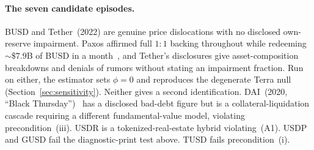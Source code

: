\paragraph{The seven candidate episodes.} BUSD and
Tether~(2022) are genuine price dislocations with no disclosed own-reserve
impairment. Paxos affirmed full $1{:}1$ backing throughout while redeeming ${\sim}\$7.9$B
of BUSD in a month~\cite{paxos2023busd}, and Tether's disclosures give asset-composition
breakdowns and denials of rumors without stating an impairment fraction. Run on either, the
estimator sets $\phi=0$ and reproduces the degenerate Terra null
(Section~\ref{sec:sensitivity}). Neither gives a second identification.
DAI~(2020, ``Black Thursday'')~\cite{Gudgeon_2020} has a disclosed bad-debt figure but is a
collateral-liquidation cascade requiring a different fundamental-value model, violating
precondition~(iii). USDR is a tokenized-real-estate hybrid violating~(A1). USDP and GUSD
fail the diagnostic-print test above. TUSD fails precondition~(i).

